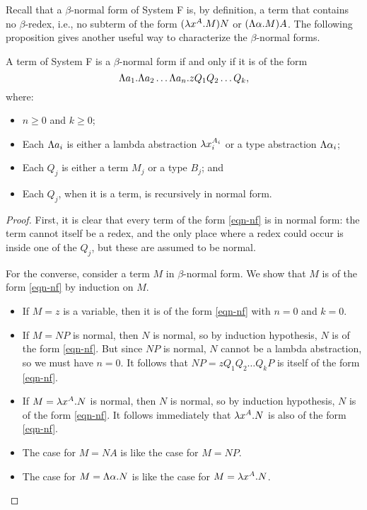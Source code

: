 \documentclass{article}
\begin{document}
Recall that a $\beta$-normal form of System F is, by definition, a
term that contains no $\beta$-redex, i.e., no subterm of the form
$(\lambda x^{A}.M)N$ or $(\Lambda\alpha.M)A$. The following
proposition gives another useful way to characterize the
$\beta$-normal forms.

\begin{proposition}
  A term of System F is a $\beta$-normal form if and only if it is of
  the form
  \begin{equation}\label{eqn-nf}
    \Lambda a_1.\Lambda a_2\ldots\Lambda a_n.zQ_1Q_2\ldots Q_k,
  \end{equation}
  where:\rm
  \begin{itemize}
  \item $n\geq 0$ and $k\geq 0$;
  \item Each $\Lambda a_i$ is either a lambda abstraction
    $\lambda x_i^{A_i}$ or a type abstraction $\Lambda\alpha_i$;
  \item Each $Q_j$ is either a term $M_j$ or a type $B_j$; and
  \item Each $Q_j$, when it is a term, is recursively in normal form.
  \end{itemize}
\end{proposition}

\begin{proof}
  First, it is clear that every term of the form {\eqref{eqn-nf}} is
  in normal form: the term cannot itself be a redex, and the only
  place where a redex could occur is inside one of the $Q_j$, but
  these are assumed to be normal. 

  For the converse, consider a term $M$ in $\beta$-normal form. We
  show that $M$ is of the form {\eqref{eqn-nf}} by induction on $M$. 
  \begin{itemize}
  \item If $M=z$ is a variable, then it is of the form
    {\eqref{eqn-nf}} with $n=0$ and $k=0$.
  \item If $M=NP$ is normal, then $N$ is normal, so
    by induction hypothesis, $N$ is of the form {\eqref{eqn-nf}}. But
    since $NP$ is normal, $N$ cannot be a lambda abstraction, so we
    must have $n=0$. It follows that $NP=zQ_1Q_2\ldots Q_kP$ is itself
    of the form {\eqref{eqn-nf}}.
  \item If $M=\lambda x^{A}.N$ is normal, then $N$ is normal, so by
    induction hypothesis, $N$ is of the form {\eqref{eqn-nf}}. It
    follows immediately that $\lambda x^{A}.N$ is also of the form
    {\eqref{eqn-nf}}.
  \item The case for $M=NA$ is like the case for $M=NP$. 
  \item The case for $M=\Lambda\alpha.N$ is like the case for
    $M=\lambda x^{A}.N$.\eot
  \end{itemize}
\end{proof}
\end{document}

